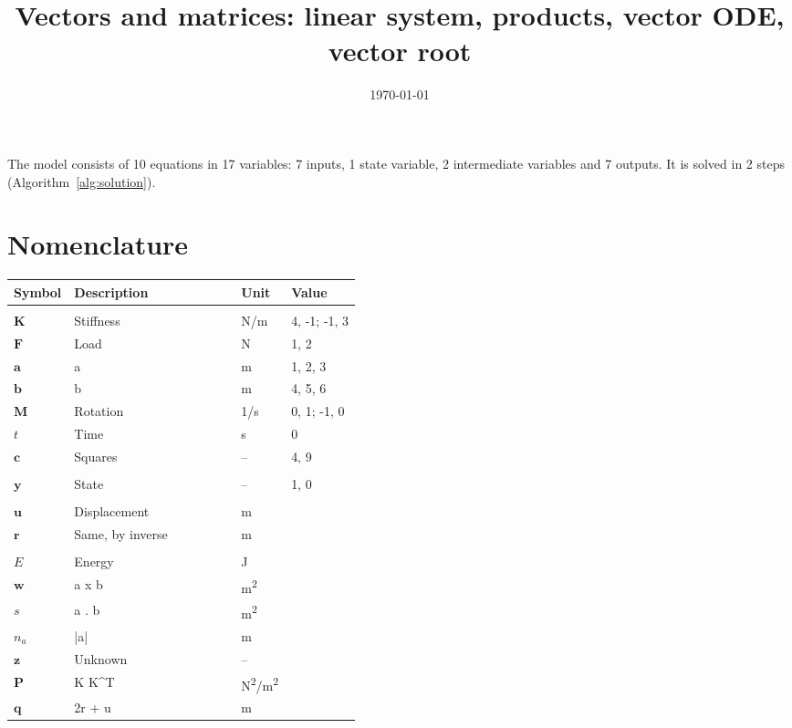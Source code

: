 \documentclass[11pt,a4paper]{article}
\title{Vectors and matrices: linear system, products, vector ODE, vector root}
\author{}
\date{\today}
\begin{document}
\maketitle

The model consists of 10 equations in 17 variables: 7 inputs, 1 state variable, 2 intermediate variables and 7 outputs. It is solved in 2 steps (Algorithm~\ref{alg:solution}).

\section{Nomenclature}
\begin{longtable}{@{}l p{0.48\linewidth} l l@{}}
  \toprule
  Symbol & Description & Unit & Value \\
  \midrule
  \endhead
  \bottomrule
  \endfoot
  \multicolumn{4}{@{}l}{\textit{Inputs}} \\
  $\mathbf{K}$ & Stiffness & \si{N/m} & 4, -1; -1, 3 \\
  $\mathbf{F}$ & Load & \si{N} & 1, 2 \\
  $\mathbf{a}$ & a & \si{m} & 1, 2, 3 \\
  $\mathbf{b}$ & b & \si{m} & 4, 5, 6 \\
  $\mathbf{M}$ & Rotation & \si{1/s} & 0, 1; -1, 0 \\
  $t$ & Time & \si{s} & \num{0} \\
  $\mathbf{c}$ & Squares & -- & 4, 9 \\
  \addlinespace
  \multicolumn{4}{@{}l}{\textit{State variables}} \\
  $\mathbf{y}$ & State & -- & 1, 0 \\
  \addlinespace
  \multicolumn{4}{@{}l}{\textit{Intermediate variables}} \\
  $\mathbf{u}$ & Displacement & \si{m} &  \\
  $\mathbf{r}$ & Same, by inverse & \si{m} &  \\
  \addlinespace
  \multicolumn{4}{@{}l}{\textit{Outputs}} \\
  $E$ & Energy & \si{J} &  \\
  $\mathbf{w}$ & a x b & \si{m^{2}} &  \\
  $s$ & a . b & \si{m^{2}} &  \\
  $n_a$ & |a| & \si{m} &  \\
  $\mathbf{z}$ & Unknown & -- &  \\
  $\mathbf{P}$ & K K\textasciicircum{}T & \si{N^{2}/m^{2}} &  \\
  $\mathbf{q}$ & 2r + u & \si{m} &  \\
\end{longtable}
\end{document}
